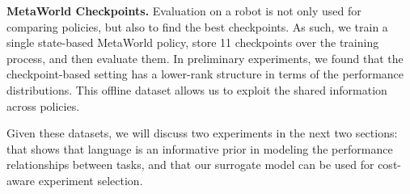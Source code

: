 \textbf{MetaWorld Checkpoints.}
Evaluation on a robot is not only used for comparing policies, but also to find the best checkpoints.
As such, we train a single state-based MetaWorld policy, store 11 checkpoints over the training process, and then evaluate them.
In preliminary experiments, we found that the checkpoint-based setting has a lower-rank structure in terms of the performance distributions.
This offline dataset allows us to exploit the shared information across policies.

Given these datasets, we will discuss two experiments in the next two sections: that shows that language is an informative prior in modeling the performance relationships between tasks, and that our surrogate model can be used for cost-aware experiment selection.







